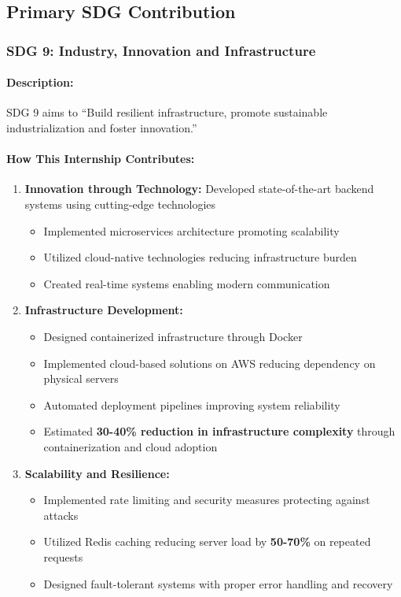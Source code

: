 \subsection{Primary SDG Contribution}

\subsubsection{SDG 9: Industry, Innovation and Infrastructure}

\paragraph{Description:}
SDG 9 aims to ``Build resilient infrastructure, promote sustainable industrialization and foster innovation.''

\paragraph{How This Internship Contributes:}

\begin{enumerate}
    \item \textbf{Innovation through Technology:} Developed state-of-the-art backend systems using cutting-edge technologies
    \begin{itemize}
        \item Implemented microservices architecture promoting scalability
        \item Utilized cloud-native technologies reducing infrastructure burden
        \item Created real-time systems enabling modern communication
    \end{itemize}
    
    \item \textbf{Infrastructure Development:}
    \begin{itemize}
        \item Designed containerized infrastructure through Docker
        \item Implemented cloud-based solutions on AWS reducing dependency on physical servers
        \item Automated deployment pipelines improving system reliability
        \item Estimated \textbf{30-40\% reduction in infrastructure complexity} through containerization and cloud adoption
    \end{itemize}
    
    \item \textbf{Scalability and Resilience:}
    \begin{itemize}
        \item Implemented rate limiting and security measures protecting against attacks
        \item Utilized Redis caching reducing server load by \textbf{50-70\%} on repeated requests
        \item Designed fault-tolerant systems with proper error handling and recovery
    \end{itemize}
\end{enumerate}


